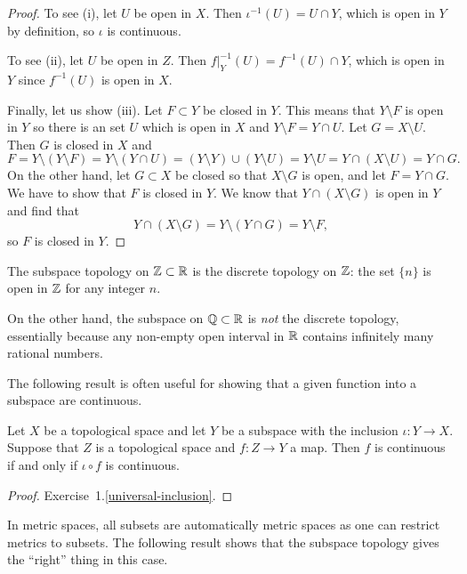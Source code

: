 \begin{proof}
  To see (i), let $U$ be open in $X$. Then $\iota^{-1}(U) = U \cap Y$, which is open in $Y$ by definition, so $\iota$ is continuous.
  
  To see (ii), let $U$ be open in $Z$. Then $f|_Y^{-1}(U) = f^{-1}(U) \cap Y$, which is open in $Y$ since $f^{-1}(U)$ is open in $X$.
  
  Finally, let us show (iii). Let $F \subset Y$ be closed in $Y$. This means that $Y \setminus F$ is open in $Y$ so there is an set $U$ which is open in $X$ and $Y \setminus F = Y \cap U$. Let $G = X \setminus U$. Then $G$ is closed in $X$ and
  \[
    F = Y \setminus (Y \setminus F) = Y \setminus (Y \cap U) = (Y \setminus Y) \cup (Y \setminus U) = Y \setminus U = Y \cap (X \setminus U) = Y \cap G.
  \]
  On the other hand, let $G \subset X$ be closed so that $X \setminus G$ is open, and let $F = Y \cap G$. We have to show that $F$ is closed in $Y$. We know that $Y \cap (X \setminus G)$ is open in $Y$ and find that
  \[
    Y \cap (X \setminus G) = Y \setminus (Y \cap G) = Y \setminus F,
  \]
  so $F$ is closed in $Y$.
\end{proof}
\begin{example}
  The subspace topology on $\mathbb{Z} \subset \mathbb{R}$ is the discrete topology on $\mathbb{Z}$: the set $\{n\}$ is open in $\mathbb{Z}$ for any integer $n$.
  
  On the other hand, the subspace on $\mathbb{Q} \subset \mathbb{R}$ is \emph{not} the discrete topology, essentially because any non-empty open interval in $\mathbb{R}$ contains infinitely many rational numbers.
\end{example}
The following result is often useful for showing that a given function into a subspace are continuous.
\begin{lem}
  \label{universal-inclusion-lemma}
  Let $X$ be a topological space and let $Y$ be a subspace with the inclusion $\iota : Y \to X$. Suppose that $Z$ is a topological space and $f : Z \to Y$ a map. Then $f$ is continuous if and only if $\iota \circ f$ is continuous.
\end{lem}
\begin{proof}
  Exercise~1.\ref{universal-inclusion}.
\end{proof}
In metric spaces, all subsets are automatically metric spaces as one can restrict metrics to subsets. The following result shows that the subspace topology gives the ``right'' thing in this case.

